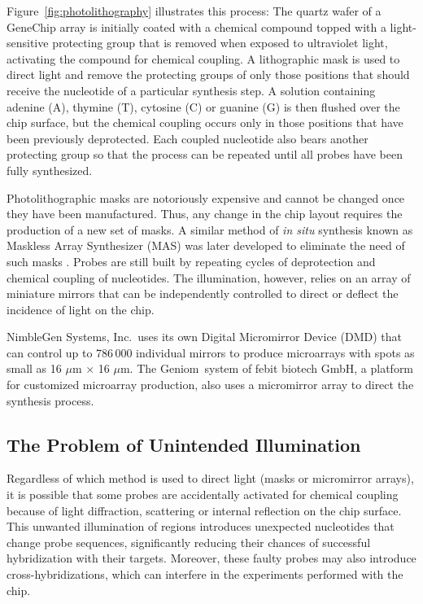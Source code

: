 Figure~\ref{fig:photolithography} illustrates this process: The quartz
wafer of a GeneChip array is initially coated with a chemical compound
topped with a light-sensitive protecting group that is removed when
exposed to ultraviolet light, activating the compound for chemical
coupling. A lithographic mask is used to direct light and remove the
protecting groups of only those positions that should receive the
nucleotide of a particular synthesis step.  A solution containing
adenine (A), thymine (T), cytosine (C) or guanine (G) is then flushed
over the chip surface, but the chemical coupling occurs only in those
positions that have been previously deprotected. Each coupled
nucleotide also bears another protecting group so that the process can
be repeated until all probes have been fully synthesized.

Photolithographic masks are notoriously expensive and cannot be changed once
they have been manufactured. Thus, any change in the chip layout requires the
production of a new set of masks. A similar method of \emph{in situ} synthesis
known as Maskless Array Synthesizer (MAS) was later developed to eliminate the
need of such masks \citep{Singh-Gasson1999}. Probes are still built by
repeating cycles of deprotection and chemical coupling of nucleotides. The
illumination, however, relies on an array of miniature mirrors that can be
independently controlled to direct or deflect the incidence of light on the
chip.

NimbleGen Systems, Inc.\ uses its own Digital Micromirror Device (DMD) that
can control up to 786\,000 individual mirrors to produce microarrays with
spots as small as 16 $\mu$m $\times$ 16 $\mu$m. The Geniom\textR\ system of
febit biotech GmbH, a platform for customized microarray production, also uses
a micromirror array to direct the synthesis process.

\subsection{The Problem of Unintended Illumination}

Regardless of which method is used to direct light (masks or micromirror
arrays), it is possible that some probes are accidentally activated for
chemical coupling because of light diffraction, scattering or internal
reflection on the chip surface. This unwanted illumination of regions
introduces unexpected nucleotides that change probe sequences,
significantly reducing their chances of successful hybridization with their
targets. Moreover, these faulty probes may also introduce
cross-hybridizations, which can interfere in the experiments performed with
the chip.

